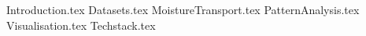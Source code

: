 \documentclass[aspectratio=169]{beamer}
\begin{document}
\maketitlepage %

{Introduction.tex}
{Datasets.tex}
{MoistureTransport.tex}
{PatternAnalysis.tex}
{Visualisation.tex}
{Techstack.tex}
\printbibliography
\end{document}
